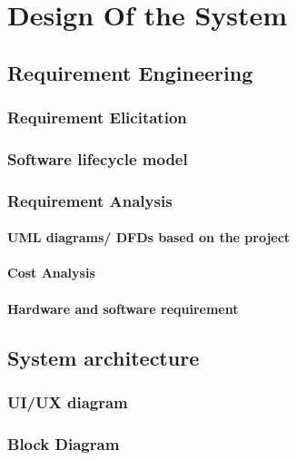 
\chapter{Design Of the System} \label{chap4}
\newpage

\section{Requirement Engineering}

\subsection{Requirement Elicitation}
\subsection{Software lifecycle model}
\subsection{Requirement Analysis}
\subsubsection{UML diagrams/ DFDs based on the project}
\subsubsection{Cost Analysis}
\subsubsection{Hardware and software requirement}


\section{System architecture}
\subsection{UI/UX diagram}
\subsection{Block Diagram}


